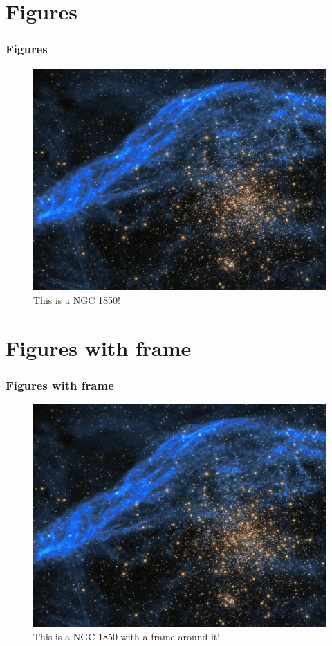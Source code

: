 \documentclass{beamer}
\begin{document}
\section{Figures}
\begin{frame}
  \frametitle{Figures}
  
  \begin{figure}
    \includegraphics[scale=0.5]{bgtitlepage.jpg}
    \caption{This is a NGC 1850!}
  \end{figure}
\end{frame}


\section{Figures with frame}
\begin{frame}
  \frametitle{Figures with frame}
  
  \begin{figure}
    \includegraphics[scale=0.5,cframe=accentcolour 0.5pt,center]{bgtitlepage.jpg}
    \caption{This is a NGC 1850 with a frame around it!}
  \end{figure}
\end{frame}
\end{document}
